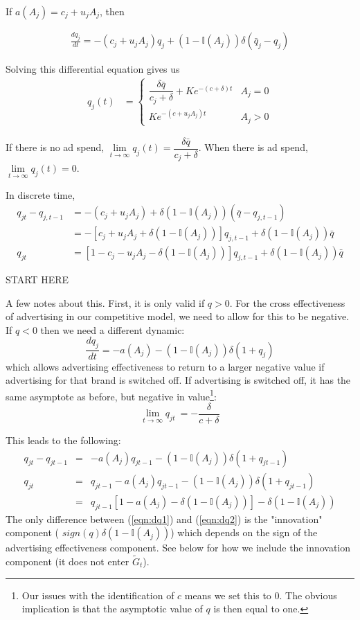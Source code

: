 \documentclass[letter,10pt]{article}
\newcommand{\Igtz}{\mathbb{I}}
\newcommand{\qbar}{\bar{q}}
\begin{document}
If $a(A_j)=c_j+u_jA_j$, then

\begin{align}
  \label{eq:1}
  \frac{dq_j}{dt} = -\left(c_j+u_jA_j\right)q_j +(1-\Igtz(A_j)) \delta (\qbar_j - q_j) 
\end{align}


Solving this differential equation gives us
\begin{align}
  \label{eq:2}
  q_j(t)&=
\begin{cases}
\dfrac{\delta\qbar}{c_j+\delta}+Ke^{-\left(c+\delta\right)t}&A_j=0\\
Ke^{-\left(c+u_jA_j\right)t}&A_j>0
\end{cases}
\end{align}

If there is no ad spend,
$\lim\limits_{t\to\infty}q_j(t)=\dfrac{\delta\qbar}{c_j+\delta}$. When
there is ad spend, $\lim\limits_{t\to\infty}q_j(t)=0$.

In discrete time, 
\begin{align}
  \label{eq:3}
  q_{jt}-q_{j,t-1}&=-\left(c_j+u_jA_j\right)+\delta\left(1-\Igtz(A_j)\right)\left(\qbar-q_{j,t-1}\right)\\
&=-\left[c_j+u_jA_j+\delta\left(1-\Igtz(A_j)\right)\right]q_{j,t-1}+\delta\left(1-\Igtz(A_j)\right)\qbar\\
q_{jt}&=\left[1-c_j-u_jA_j-\delta\left(1-\Igtz(A_j)\right)\right]q_{j,t-1}+\delta\left(1-\Igtz(A_j)\right)\qbar
\end{align}


START HERE



A few notes about this.  First, it is only valid if $q>0$. For the cross effectiveness of 
advertising in our competitive model, we need to allow for this to be negative.  If $q<0$ then we need a different
dynamic:
\[
\frac{dq_j}{dt} = -a(A_j) - (1-\Igtz(A_j)) \delta (1 + q_j) 
\]
which allows advertising effectiveness to return to a larger negative value if advertising for
that brand is switched off.  If advertising is switched off, it has the same asymptote as before, 
but negative in value\footnote{\baselineskip 12pt Our issues with the identification of $c$ 
means we set this to $0$.  The obvious implication is that the asymptotic value of $q$ is then 
equal to one.}:
\[
\lim_{t \rightarrow \infty} q_{jt} ~=  -\frac{\delta}{c+\delta}
\]

This leads to the following:
\begin{eqnarray}
q_{jt} - q_{jt-1} & = & -a(A_j) q_{jt-1} - (1-\Igtz(A_j))\delta (1+ q_{jt-1})\nonumber\\
q_{jt} & = & q_{jt-1} -a(A_j) q_{jt-1} - (1-\Igtz(A_j))\delta (1+ q_{jt-1})\nonumber\\
& = & q_{jt-1} \left[1-a(A_j) -\delta (1-\Igtz(A_j))\right]  - \delta (1- \Igtz(A_j))
\label{eqn:dq2}
\end{eqnarray}
The only difference between (\ref{eqn:dq1}) and (\ref{eqn:dq2}) is the "innovation" component ( $sign(q) \delta(1-\Igtz(A_j))$)
which depends on the sign of the advertising effectiveness component.  See below for how
we include the innovation component (it does not enter $\tilde{G}_t$).
\end{document}
